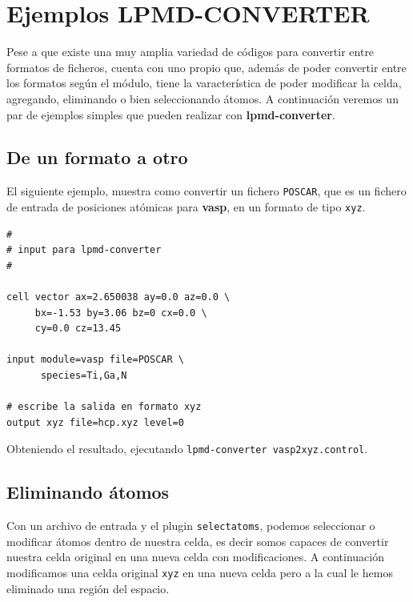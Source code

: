 \section{Ejemplos LPMD-CONVERTER}

Pese a que existe una muy amplia variedad de c\'odigos para convertir entre formatos de ficheros, \lpmd cuenta con uno propio que, adem\'as de poder convertir entre los formatos seg\'un el m\'odulo, tiene la varacter\'istica de poder modificar la celda, agregando, eliminando o bien seleccionando \'atomos. A continuaci\'on veremos un par de ejemplos simples que pueden realizar con \textbf{lpmd-converter}.

\subsection{De un formato a otro}

El siguiente ejemplo, muestra como convertir un fichero \verb|POSCAR|, que es un fichero de entrada de posiciones at\'omicas para \textbf{vasp}, en un formato de tipo \verb|xyz|.

\begin{multicols}{2}
\setlength{\columnseprule}{.5pt}
\begin{verbatim}
#
# input para lpmd-converter
#

cell vector ax=2.650038 ay=0.0 az=0.0 \
     bx=-1.53 by=3.06 bz=0 cx=0.0 \
     cy=0.0 cz=13.45

input module=vasp file=POSCAR \
      species=Ti,Ga,N

# escribe la salida en formato xyz
output xyz file=hcp.xyz level=0
\end{verbatim}
\end{multicols}

Obteniendo el resultado, ejecutando \verb|lpmd-converter vasp2xyz.control|.

\subsection{Eliminando \'atomos}

Con un archivo de entrada y el plugin \verb|selectatoms|, podemos seleccionar o modificar \'atomos dentro de nuestra celda, es decir somos capaces de convertir nuestra celda original en una nueva celda con modificaciones. A continuaci\'on modificamos una celda original \verb|xyz| en una nueva celda pero a la cual le hemos eliminado una regi\'on del espacio.

